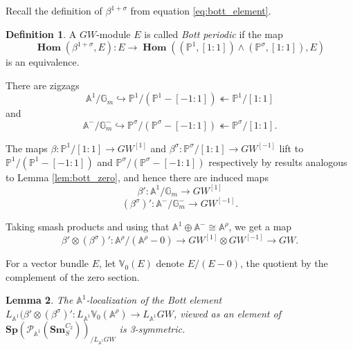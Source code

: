 \documentclass[edeposit,fullpage]{uiucthesis2009}
\newcommand{\mbb}{\mathbb}
\newcommand{\mc}{\mathcal}
\newcommand{\Sm}[1]{\mathbf{Sm}_{#1}}
\newcommand{\Sp}{\mathbf{Sp}}
\DeclareMathOperator{\iHom}{\mathbf{Hom}}
\theoremstyle{plain}
\newtheorem{lemma}{Lemma}
\numberwithin{lemma}{section}
\theoremstyle{definition}
\newtheorem{definition}[lemma]{Definition}
\begin{document}
Recall the definition of $\beta^{1+\sigma}$ from equation
\ref{eq:bott_element}.

\begin{definition}
A $GW$-module $E$ is called \emph{Bott periodic} if the map
\[
\iHom(\beta^{1+\sigma},E): E
\rightarrow \iHom((\mbb P^1,[1:1])\wedge (\mbb P^\sigma,[1:1]),E)
\]
is an equivalence.
\end{definition}

There are zigzags
\[
\mbb A^1/\mbb G_m \hookrightarrow \mbb P^1/(\mbb P^1 - [-1:1])
\twoheadleftarrow \mbb P^1/[1:1]
\]
and 
\[
\mbb A^-/\mbb G_m^- \hookrightarrow \mbb P^\sigma/(\mbb P^\sigma - [-1:1])
\twoheadleftarrow \mbb P^\sigma/[1:1].
\]

The maps $\beta :  \mbb P^1/[1:1] \rightarrow GW^{[1]}$ and
$\beta^\sigma : \mbb P^\sigma/[1:1] \rightarrow GW^{[-1]}$ lift to
$\mbb P^1/(\mbb P^1 - [-1:1])$ and $\mbb P^\sigma/(\mbb P^\sigma -
[-1:1])$ respectively by results analogous to Lemma
\ref{lem:bott_zero}, and hence there are induced maps 
\[
\beta' : \mbb A^1/\mbb G_m \rightarrow GW^{[1]}
\]
\[
(\beta^\sigma)' : \mbb A^-/\mbb G_m^- \rightarrow GW^{[-1]}.
\]

Taking smash products and using that $\mbb A^1 \oplus \mbb A^- \cong
\mbb A^\rho$, we get a map
\[
\beta' \otimes (\beta^\sigma)' : \mbb
A^\rho/(\mbb A^\rho - 0) \rightarrow GW^{[1]} \otimes GW^{[-1]}
\rightarrow GW.
\]

For a vector bundle $E$, let $\mbb V_0(E)$ denote $E/(E-0)$, the
quotient by the complement of the zero section.

\begin{lemma}\label{lem:bott_3symm}
The $\mbb A^1$-localization of the Bott element $L_{\mbb A^1}(\beta'
\otimes (\beta^\sigma)' : L_{\mbb A^1} \mbb V_0(\mbb A^\rho)
\rightarrow L_{\mbb A^1} GW$, viewed as an element of $\Sp(\mc P_{\mbb
  A^1}(\Sm{S}^{C_2}))_{/L_{\mbb A^1}GW}$ is 3-symmetric.
\end{lemma}
\end{document}
